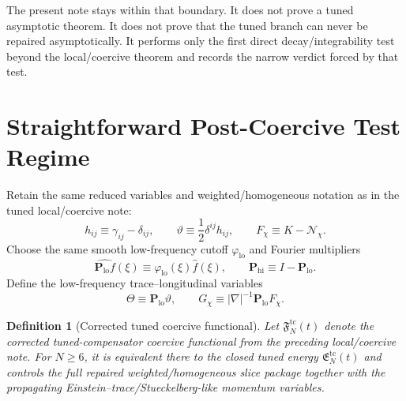 \documentclass[11pt]{article}
\newtheorem{definition}{Definition}
\begin{document}
The present note stays within that boundary. It does not prove a tuned asymptotic theorem. It does not prove that the tuned branch can never be repaired asymptotically. It performs only the first direct decay/integrability test beyond the local/coercive theorem and records the narrow verdict forced by that test.

\section{Straightforward Post-Coercive Test Regime}

Retain the same reduced variables and weighted/homogeneous notation as in the tuned local/coercive note:
\begin{equation}
h_{ij}\equiv \gamma_{ij}-\delta_{ij},
\qquad
\vartheta\equiv \frac12\delta^{ij}h_{ij},
\qquad
F_\chi\equiv K-\mathcal N_\chi.
\label{eq:basicdefs}
\end{equation}
Choose the same smooth low-frequency cutoff \(\varphi_{\mathrm{lo}}\) and Fourier multipliers
\begin{equation}
\widehat{\mathbf P_{\mathrm{lo}}f}(\xi)
\equiv
\varphi_{\mathrm{lo}}(\xi)\widehat f(\xi),
\qquad
\mathbf P_{\mathrm{hi}}\equiv I-\mathbf P_{\mathrm{lo}}.
\label{eq:projectors}
\end{equation}
Define the low-frequency trace--longitudinal variables
\begin{equation}
\Theta\equiv \mathbf P_{\mathrm{lo}}\vartheta,
\qquad
G_\chi\equiv |\nabla|^{-1}\mathbf P_{\mathrm{lo}}F_\chi.
\label{eq:ThetaG}
\end{equation}

\begin{definition}[Corrected tuned coercive functional]
\label{def:Ftc}
Let \(\mathfrak F_N^{\mathrm{tc}}(t)\) denote the corrected tuned-compensator coercive functional from the preceding local/coercive note. For \(N\ge 6\), it is equivalent there to the closed tuned energy \(\mathfrak E_N^{\mathrm{tc}}(t)\) and controls the full repaired weighted/homogeneous slice package together with the propagating Einstein--trace/Stueckelberg-like momentum variables.
\end{definition}
\end{document}
